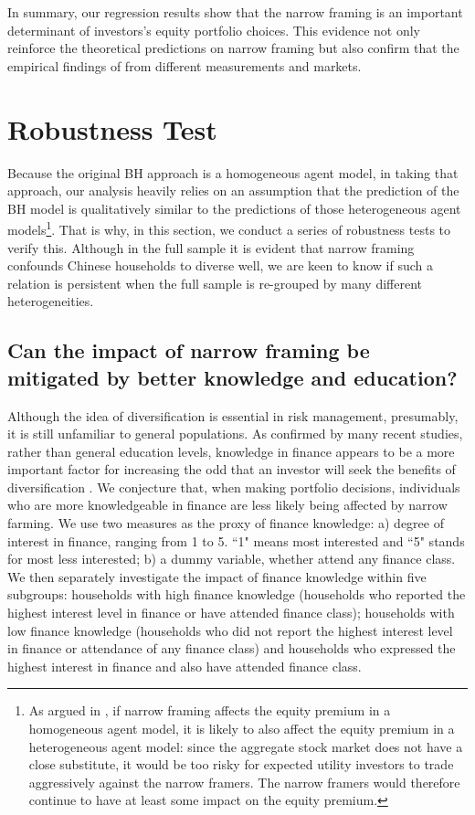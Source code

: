 \documentclass[ukenglish,nottitlepage,thmsb,11pt,letterpaper]{article}
\begin{document}
In summary, our regression results show that the narrow framing is an important determinant of investors's equity portfolio choices. This evidence not only reinforce the theoretical predictions on narrow framing \citep[e.g., ][]{Kahneman1983,Barberis2009} but also confirm that the empirical findings of \cite{Kumar2008} from different measurements and markets.    

\section{Robustness Test}

Because the original BH approach is a homogeneous agent model, in taking that approach, our analysis heavily relies on an assumption that the prediction of the BH model is qualitatively similar to the predictions of those heterogeneous agent models\footnote{As argued in \cite{Barberis2009}, if narrow framing affects the equity premium in a homogeneous agent model, it is likely to also affect the equity premium in a heterogeneous agent model: since the aggregate stock market does not have a close substitute, it would be too risky for expected utility investors to trade aggressively against the narrow framers. The narrow framers would therefore continue to have at least some impact on the equity premium.}. That is why, in this section, we conduct a series of robustness tests to verify this.  Although in the full sample it is evident that narrow framing confounds Chinese households to diverse well, we are keen to know if such a relation is persistent when the full sample is re-grouped by many different heterogeneities.

\subsection{Can the impact of narrow framing be mitigated by better knowledge and education?}

Although the idea of diversification is essential in risk management, presumably, it is still unfamiliar to general populations. As confirmed by many recent studies, rather than general education levels,  knowledge in finance appears to be a more important factor for increasing the odd that an investor will seek the benefits of diversification \citep[e.g., ][]{Hibbert2012,Fuertes2014,Balloch2014}. We conjecture that, when making portfolio decisions, individuals who are more knowledgeable in finance are less likely being affected by narrow farming. We use two measures as the proxy of finance knowledge: a) degree of interest in finance, ranging from 1 to 5. ``1" means most interested and ``5" stands for most less interested; b) a dummy variable, whether attend any finance class. We then separately investigate the impact of finance knowledge within five subgroups: households with high finance knowledge (households who reported the highest interest level in finance or have attended finance class); households with low finance knowledge (households who did not report the highest interest level in finance or attendance of any finance class) and households who expressed the highest interest in finance and also have attended finance class. 
\end{document}
